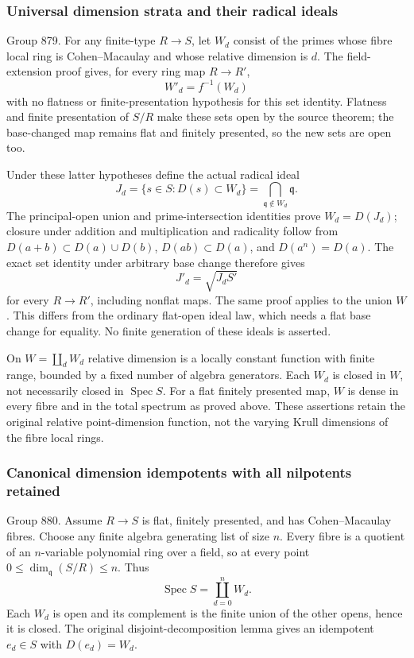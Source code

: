 \subsubsection{Universal dimension strata and their radical ideals}\label{algebra-proof-040-universal-dimension-strata-and-their-radical-ideals}

Group 879. For any finite-type \(R\to S\), let \(W_d\) consist of the primes whose fibre local ring is Cohen--Macaulay and whose relative dimension is \(d\). The field-extension proof gives, for every ring map \(R\to R'\), \[
W'_d=f^{-1}(W_d)
\] with no flatness or finite-presentation hypothesis for this set identity. Flatness and finite presentation of \(S/R\) make these sets open by the source theorem; the base-changed map remains flat and finitely presented, so the new sets are open too.

Under these latter hypotheses define the actual radical ideal \[
J_d=\{s\in S:D(s)\subset W_d\}
    =\bigcap_{\mathfrak q\notin W_d}\mathfrak q .
\] The principal-open union and prime-intersection identities prove \(W_d=D(J_d)\); closure under addition and multiplication and radicality follow from \(D(a+b)\subset D(a)\cup D(b)\), \(D(ab)\subset D(a)\), and \(D(a^n)=D(a)\). The exact set identity under arbitrary base change therefore gives \[
J'_d=\sqrt{J_d S'}
\] for every \(R\to R'\), including nonflat maps. The same proof applies to the union \(W\). This differs from the ordinary flat-open ideal law, which needs a flat base change for equality. No finite generation of these ideals is asserted.

On \(W=\coprod_d W_d\) relative dimension is a locally constant function with finite range, bounded by a fixed number of algebra generators. Each \(W_d\) is closed in \(W\), not necessarily closed in \(\operatorname{Spec}S\). For a flat finitely presented map, \(W\) is dense in every fibre and in the total spectrum as proved above. These assertions retain the original relative point-dimension function, not the varying Krull dimensions of the fibre local rings.

\subsubsection{Canonical dimension idempotents with all nilpotents retained}\label{algebra-proof-040-canonical-dimension-idempotents-with-all-nilpotents-retained}

Group 880. Assume \(R\to S\) is flat, finitely presented, and has Cohen--Macaulay fibres. Choose any finite algebra generating list of size \(n\). Every fibre is a quotient of an \(n\)-variable polynomial ring over a field, so at every point \(0\leq\dim_{\mathfrak q}(S/R)\leq n\). Thus \[
\operatorname{Spec}S=\coprod_{d=0}^n W_d .
\] Each \(W_d\) is open and its complement is the finite union of the other opens, hence it is closed. The original disjoint-decomposition lemma gives an idempotent \(e_d\in S\) with \(D(e_d)=W_d\).

